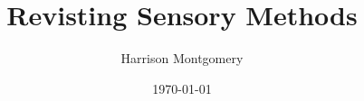 \documentclass[12pt]{article}
\title{Revisting Sensory Methods}
\author{Harrison Montgomery}
\date{\today}
\begin{document}
\maketitle
\doublespacing


\printbibliography
\end{document}
